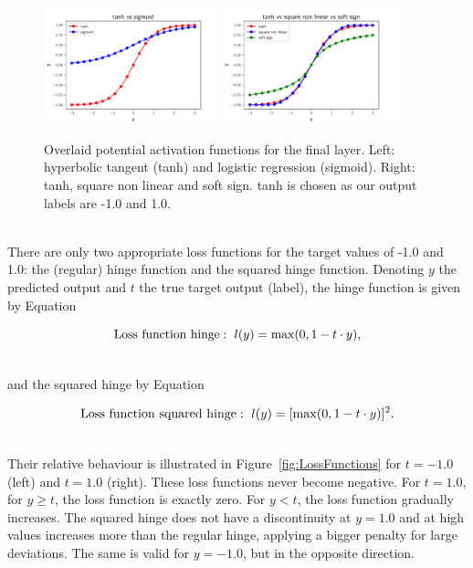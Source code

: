 \begin{figure}[htb]
\centering
\includegraphics[width=0.45\textwidth]{plots/ActivationFunctionsLastLayer1.pdf}
\includegraphics[width=0.45\textwidth]{plots/ActivationFunctionsLastLayer2.pdf}
\caption{Overlaid potential activation functions for the final layer. Left: hyperbolic tangent (tanh) and logistic regression (sigmoid). Right: tanh, square non linear and soft sign. tanh is chosen as our output labels are -1.0 and 1.0.}
\label{fig:ActivationFunctionsLastLayer}
\end{figure}

\ \\There are only two appropriate loss functions for the target values of -1.0 and 1.0: the (regular) hinge function and the squared hinge function. Denoting $y$ the predicted output and $t$ the true target output (label), the hinge function is given by Equation

\begin{equation}
   \LossFunctionHinge:~l(y) = \max(0, 1 - t \cdot y),
\end{equation}

\ \\and the squared hinge by Equation

\begin{equation}
   \LossFunctionSquaredHinge:~l(y) = [\max(0, 1 - t \cdot y)]^2.
\end{equation}

\ \\Their relative behaviour is illustrated in Figure~\ref{fig:LossFunctions} for $t=-1.0$ (left) and $t=1.0$ (right). These loss functions never become negative. For $t=1.0$, for $y \ge t$, the loss function is exactly zero. For $y<t$, the loss function gradually increases. The squared hinge does not have a discontinuity at $y=1.0$ and at high values increases more than the regular hinge, applying a bigger penalty for large deviations. The same is valid for $y=-1.0$, but in the opposite direction. 

